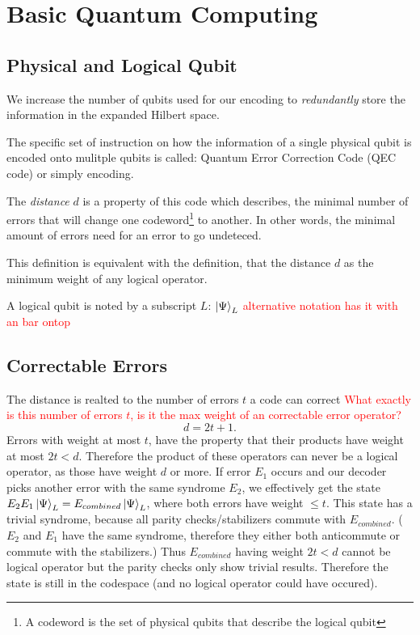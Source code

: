 \section{Basic Quantum Computing}


\subsection{Physical and Logical Qubit}
We increase the number of qubits used for our encoding to \textit{redundantly} store the information in the expanded Hilbert space. \cite{QECintro}

The specific set of instruction on how the information of a single physical 
qubit is encoded onto mulitple qubits is called:
Quantum Error Correction Code (QEC code) or simply encoding. \cite{QECintro}

The \textit{distance} $d$ is a property of this code which describes, 
the minimal number of errors that will change one 
codeword\footnote{A codeword is the set of physical qubits that describe the logical qubit} to another.
In other words, the minimal amount of errors need for an error to go undeteced. \cite{QECintro}

This definition is equivalent with the definition, that the distance $d$ as the minimum weight of any logical operator. \cite{QECmemory}

A logical qubit is noted by a subscript $L$: $\ket{\Psi}_L$
\textcolor{red}{alternative notation has it with an bar ontop}


\subsection{Correctable Errors}
The distance is realted to the number of errors $t$ a code can correct \cite{QECintro}
\textcolor{red}{What exactly is this number of errors $t$, is it the max weight of an correctable error operator?}
\begin{equation}
    d = 2t+1.
\end{equation}
Errors with weight at most $t$, have the property that their products have weight at most $2t<d$.
Therefore the product of these operators can never be a logical operator, as those have weight $d$ or more. 
If error $E_1$ occurs and our decoder picks another error with the same syndrome $E_2$, 
we effectively get the state $E_2 E_1 \ket{\Psi}_L = E_{combined} \ket{\Psi}_L$, where both errors have weight $\leq t$.
This state has a trivial syndrome, because all parity checks/stabilizers commute with $E_{combined}$.
($E_2$ and $E_1$ have the same syndrome, therefore they either both anticommute or commute with the stabilizers.) 
Thus $E_{combined}$ having weight $2t<d$ cannot be logical operator but the parity checks only show trivial results. \cite{QECmemory}
Therefore the state is still in the codespace (and no logical operator could have occured).

